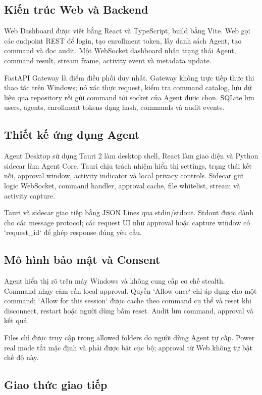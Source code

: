 \documentclass[12pt,a4paper]{article}
\begin{document}
\subsection{Kiến trúc Web và Backend}

Web Dashboard được viết bằng React và TypeScript, build bằng Vite. Web gọi các endpoint REST để login, tạo enrollment token, lấy danh sách Agent, tạo command và đọc audit. Một WebSocket dashboard nhận trạng thái Agent, command result, stream frame, activity event và metadata update.

FastAPI Gateway là điểm điều phối duy nhất. Gateway không trực tiếp thực thi thao tác trên Windows; nó xác thực request, kiểm tra command catalog, lưu dữ liệu qua repository rồi gửi command tới socket của Agent được chọn. SQLite lưu users, agents, enrollment tokens dạng hash, commands và audit events.

\subsection{Thiết kế ứng dụng Agent}

Agent Desktop sử dụng Tauri 2 làm desktop shell, React làm giao diện và Python sidecar làm Agent Core. Tauri chịu trách nhiệm hiển thị settings, trạng thái kết nối, approval window, activity indicator và local privacy controls. Sidecar giữ logic WebSocket, command handler, approval cache, file whitelist, stream và activity capture.

Tauri và sidecar giao tiếp bằng JSON Lines qua stdin/stdout. Stdout được dành cho các message protocol; các request UI như approval hoặc capture window có `request_id` để ghép response đúng yêu cầu.

\subsection{Mô hình bảo mật và Consent}

Agent hiển thị rõ trên máy Windows và không cung cấp cơ chế stealth. Command nhạy cảm cần local approval. Quyền `Allow once` chỉ áp dụng cho một command; `Allow for this session` được cache theo command cụ thể và reset khi disconnect, restart hoặc người dùng bấm reset. Audit lưu command, approval và kết quả.

Files chỉ được truy cập trong allowed folders do người dùng Agent tự cấp. Power real mode tắt mặc định và phải được bật cục bộ; approval từ Web không tự bật chế độ này.

\subsection{Giao thức giao tiếp}
\end{document}
